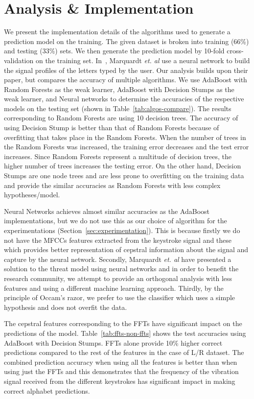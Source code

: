 \documentclass[11pt,conference]{IEEEtran}
\begin{document}
\section{Analysis \& Implementation}
\label{sec:implementation}
\noindent We present the implementation details of the algorithms used to generate a prediction model on the training. The given dataset is broken into training (66\%) and testing (33\%) sets. We then generate the prediction model by 10-fold cross-validation on the training set. In~\cite{spiphone}, Marquardt \emph{et. al} use a neural network to build the signal profiles of the letters typed by the user. Our analysis builds upon their paper, but compares the accuracy of multiple algorithms. We use AdaBoost with Random Forests as the weak learner, AdaBoost with Decision Stumps as the weak learner, and Neural networks to determine the accuracies of the respective models on the testing set (shown in Table~\ref{tab:algos-compare}). The results corresponding to Random Forests are using 10 decision trees. The accuracy of using Decision Stump is better than that of Random Forests because of overfitting that takes place in the Random Forests. When the number of trees in the Random Forests was increased, the training error decreases and the test error increases. Since Random Forests represent a multitude of decision trees, the higher number of trees increases the testing error. On the other hand, Decision Stumps are one node trees and are less prone to overfitting on the training data and provide the similar accuracies as Random Forests with less complex hypotheses/model. 

Neural Networks achieves almost similar accuracies as the AdaBoost implementations, but we do not use this as our choice of algorithm for the experimentations (Section~\ref{sec:experimentation}). This is because firstly we do not have the MFCCs features extracted from the keystroke signal and these which provides better representation of cepstral information about the signal and capture by the neural network. Secondly, Marquardt \emph{et. al} have presented a solution to the threat model using neural networks and in order to benefit the research community, we attempt to provide an orthogonal analysis with less features and using a different machine learning approach. Thirdly, by the principle of Occam's razor, we prefer to use the classifier which uses a simple hypothesis and does not overfit the data.

The cepstral features corresponding to the FFTs have significant impact on the predictions of the model. Table~\ref{tab:ffts-non-ffts} shows the test accuracies using AdaBoost with Decision Stumps. FFTs alone provide 10\% higher correct predictions compared to the rest of the features in the case of L/R dataset. The combined prediction accuracy when using all the features is better than when using just the FFTs and this demonstrates that the frequency of the vibration signal received from the different keystrokes has significant impact in making correct alphabet predictions.
\end{document}
